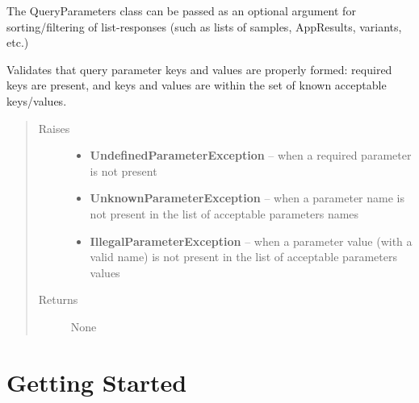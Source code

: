 \documentclass[letterpaper,10pt,english]{sphinxmanual}
\begin{document}
\begin{fulllineitems}
\label{Available modules:BaseSpacePy.model.QueryParameters.QueryParameters}
The QueryParameters class can be passed as an optional argument
for sorting/filtering of list-responses (such as lists of samples, AppResults, variants, etc.)

\begin{fulllineitems}
\label{Available modules:BaseSpacePy.model.QueryParameters.QueryParameters.validate}
Validates that query parameter keys and values are properly formed:
required keys are present, and keys and values are within the set of 
known acceptable keys/values.
\begin{quote}\begin{description}
\item[{Raises}] \leavevmode\begin{itemize}
\item {} 
\textbf{UndefinedParameterException} -- when a required parameter is not present

\item {} 
\textbf{UnknownParameterException} -- when a parameter name is not present in the list of acceptable parameters names

\item {} 
\textbf{IllegalParameterException} -- when a parameter value (with a valid name) is not present in the list of acceptable parameters values

\end{itemize}

\item[{Returns}] \leavevmode
None

\end{description}\end{quote}

\end{fulllineitems}


\end{fulllineitems}



\chapter{Getting Started}
\label{Getting Started:getting-started}\label{Getting Started::doc}
\end{document}
